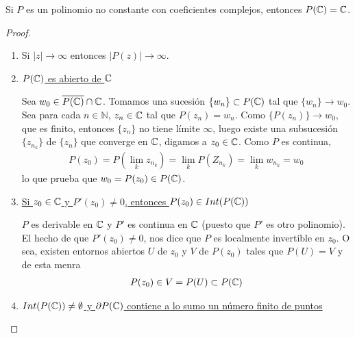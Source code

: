 \begin{teo}
    Si $P$ es un polinomio no constante con coeficientes complejos, entonces $P(\mathbb{C}) = \mathbb{C}$.
\end{teo}

\begin{proof}
    \begin{enumerate}
        \item Si $|z| \to \infty$ entonces $|P(z)| \to \infty$.
        \item \underline{$P(\mathbb{C})$ es abierto de $\mathbb{C}$}

              Sea $w_0 \in \overline{P(\mathbb{C})} \cap \mathbb{C}$. Tomamos una sucesión $\{w_n\} \subset P(\mathbb{C})$ tal que $\{w_n\} \to w_0$. Sea para cada $n \in \mathbb{N}$, $z_n \in \mathbb{C}$ tal que $P(z_n) = w_n$. Como $\{P(z_n)\} \to w_0$, que es finito, entonces $\{z_n\}$ no tiene límite $\infty$, luego existe una subsucesión $\{z_{n_k}\}$ de $\{z_n\}$ que converge en $\mathbb{C}$, digamos a $z_0 \in \mathbb{C}$. Como $P$ es continua,
              \begin{align*}
                  P(z_0) = P\left( \lim_{k}{z_{n_k}}\right) = \lim_{k}{P(Z_{n_k})} = \lim_{k}{w_{n_k}} = w_0
              \end{align*}
              lo que prueba que $w_0 = P(z_0) \in P(\mathbb{C})$.
        \item \underline{Si $z_0 \in \mathbb{C}$ y $P'(z_0) \not = 0$, entonces $P(z_0) \in Int(P(\mathbb{C}))$}

              $P$ es derivable en $\mathbb{C}$ y $P'$ es continua en $\mathbb{C}$ (puesto que $P'$ es otro polinomio). El hecho de que $P'(z_0) \not = 0$, nos dice que $P$ es localmente invertible en $z_0$. O sea, existen entornos abiertos $U$ de $z_0$ y $V$ de $P(z_0)$ tales que $P(U) = V$ y de esta menra
              \begin{align*}
                  P(z_0) \in V = P(U) \subset P(\mathbb{C})
              \end{align*}
        \item \underline{$Int(P(\mathbb{C})) \not = \emptyset$ y $\partial P(\mathbb{C})$ contiene a lo sumo un número finito de puntos}


\end{enumerate}
\end{proof}
